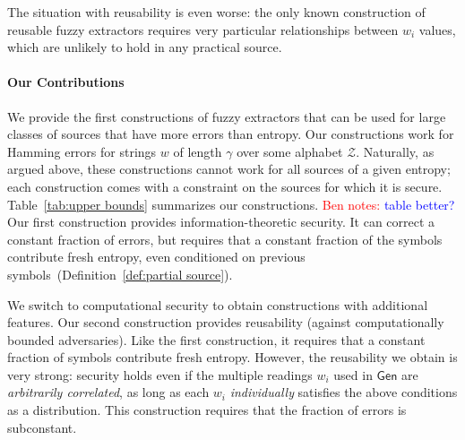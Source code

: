 \documentclass[11pt]{article}
\newcommand{\defref}[1]{\mbox{Definition~\ref{#1}}}
\newcommand{\class}[1]{{\ensuremath{\mathsf{#1}}}}
\newcommand{\gen}{\ensuremath{\class{Gen}}\xspace}
\newcommand{\Huse}{\mathrm{H}_{\mathtt{usable}}}
\newcommand{\authnote}[2]{{\textcolor{red}{\textsf{#1 notes: }\textcolor{blue}{ #2}}\marginpar{\textcolor{red}{\textbf{!!!!!}}}}}
\newcommand{\authnote}[2]{}
\newcommand{\bnote}[1]{{\authnote{Ben}{#1}}}
\newcommand{\lnote}[1]{{\authnote{Leo}{#1}}}
\begin{document}


The situation with reusability is even worse: the only known construction of reusable fuzzy extractors \cite{Boyen2004} requires very particular relationships between $w_i$ values, which are unlikely to hold in any practical source.

\paragraph{Our Contributions}
We provide the first constructions of fuzzy extractors that can be used for large classes of sources that have more errors than entropy.  Our constructions work for Hamming errors for strings $w$ of length $\gamma$ over some alphabet $\mathcal{Z}$. Naturally, as argued above, these constructions cannot work for all sources of a given entropy; each construction comes with a constraint on the sources for which it is secure.  Table~\ref{tab:upper bounds} summarizes our constructions. \bnote{table better?}
Our first construction provides information-theoretic security.  It can correct a constant fraction of errors, but requires that a constant fraction of the symbols contribute fresh entropy, even conditioned on previous symbols~(\defref{def:partial source}). %

We switch to computational security to obtain constructions with additional features. Our second construction provides reusability (against computationally bounded adversaries).  Like the first construction,
it requires that a constant fraction of symbols contribute fresh entropy. However,
the reusability we obtain is very strong:  security holds even if the multiple readings $w_i$ used in $\gen$ are \emph{arbitrarily correlated}, as long as each $w_i$ \emph{individually} satisfies the above conditions as a distribution. 
This construction requires that the fraction of errors is subconstant. 
\end{document}
